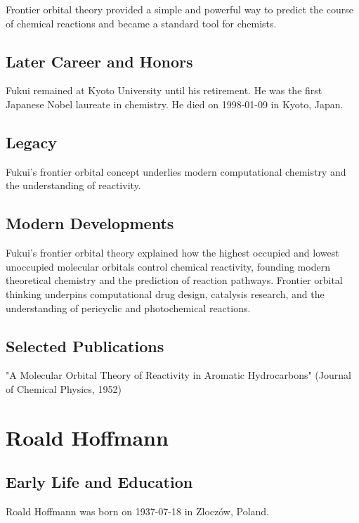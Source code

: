 Frontier orbital theory provided a simple and powerful way to predict the course of chemical reactions and became a standard tool for chemists.

\subsection*{Later Career and Honors}

Fukui remained at Kyoto University until his retirement. He was the first Japanese Nobel laureate in chemistry. He died on 1998-01-09 in Kyoto, Japan.

\subsection*{Legacy}

Fukui's frontier orbital concept underlies modern computational chemistry and the understanding of reactivity.

\subsection*{Modern Developments}

Fukui's frontier orbital theory explained how the highest occupied and lowest unoccupied molecular orbitals control chemical reactivity, founding modern theoretical chemistry and the prediction of reaction pathways. Frontier orbital thinking underpins computational drug design, catalysis research, and the understanding of pericyclic and photochemical reactions.

\subsection*{Selected Publications}

"A Molecular Orbital Theory of Reactivity in Aromatic Hydrocarbons" (Journal of Chemical Physics, 1952)

\clearpage

\section{Roald Hoffmann}

\subsection*{Early Life and Education}

Roald Hoffmann was born on 1937-07-18 in Zloczów, Poland.

